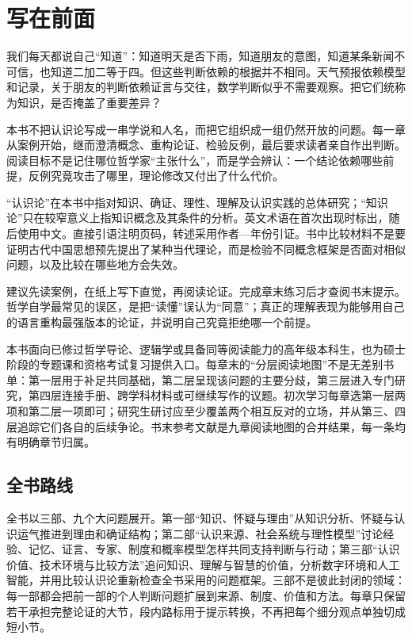 \chapter*{写在前面}

我们每天都说自己“知道”：知道明天是否下雨，知道朋友的意图，知道某条新闻不可信，也知道二加二等于四。但这些判断依赖的根据并不相同。天气预报依赖模型和记录，关于朋友的判断依赖证言与交往，数学判断似乎不需要观察。把它们统称为知识，是否掩盖了重要差异？

本书不把认识论写成一串学说和人名，而把它组织成一组仍然开放的问题。每一章从案例开始，继而澄清概念、重构论证、检验反例，最后要求读者亲自作出判断。阅读目标不是记住哪位哲学家“主张什么”，而是学会辨认：一个结论依赖哪些前提，反例究竟攻击了哪里，理论修改又付出了什么代价。

“认识论”在本书中指对知识、确证、理性、理解及认识实践的总体研究；“知识论”只在较窄意义上指知识概念及其条件的分析。英文术语在首次出现时标出，随后使用中文。直接引语注明页码，转述采用作者—年份引证。书中比较材料不是要证明古代中国思想预先提出了某种当代理论，而是检验不同概念框架是否面对相似问题，以及比较在哪些地方会失效。

建议先读案例，在纸上写下直觉，再阅读论证。完成章末练习后才查阅书末提示。哲学自学最常见的误区，是把“读懂”误认为“同意”；真正的理解表现为能够用自己的语言重构最强版本的论证，并说明自己究竟拒绝哪一个前提。

本书面向已修过哲学导论、逻辑学或具备同等阅读能力的高年级本科生，也为硕士阶段的专题课和资格考试复习提供入口。每章末的“分层阅读地图”不是无差别书单：第一层用于补足共同基础，第二层呈现该问题的主要分歧，第三层进入专门研究，第四层连接手册、跨学科材料或可继续写作的议题。初次学习每章选第一层两项和第二层一项即可；研究生研讨应至少覆盖两个相互反对的立场，并从第三、四层追踪它们各自的后续争论。书末参考文献是九章阅读地图的合并结果，每一条均有明确章节归属。

\section*{全书路线}

全书以三部、九个大问题展开。第一部“知识、怀疑与理由”从知识分析、怀疑与认识运气推进到理由和确证结构；第二部“认识来源、社会系统与理性模型”讨论经验、记忆、证言、专家、制度和概率模型怎样共同支持判断与行动；第三部“认识价值、技术环境与比较方法”追问知识、理解与智慧的价值，分析数字环境和人工智能，并用比较认识论重新检查全书采用的问题框架。三部不是彼此封闭的领域：每一部都会把前一部的个人判断问题扩展到来源、制度、价值和方法。每章只保留若干承担完整论证的大节，段内路标用于提示转换，不再把每个细分观点单独切成短小节。
